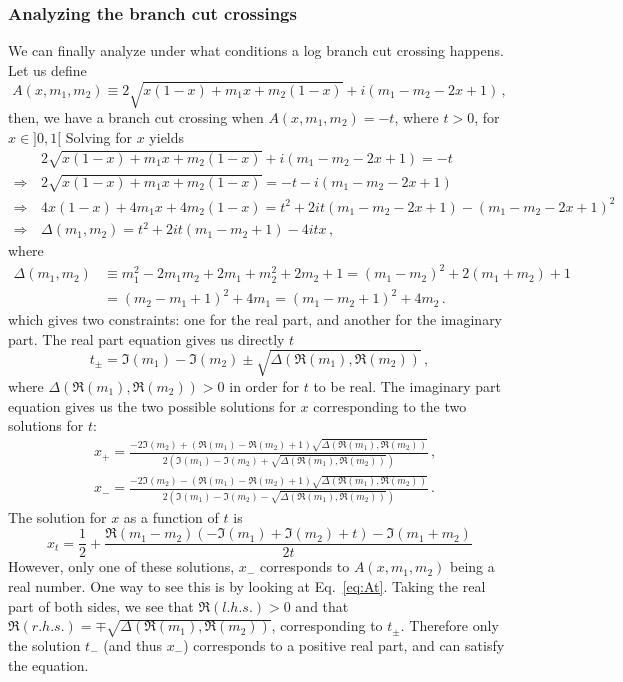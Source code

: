 \documentclass[twoside]{article}
\begin{document}
\subsubsection{Analyzing the branch cut crossings}

We can finally analyze under what conditions a log branch cut crossing happens. Let us define 
\begin{equation}
\label{eq:A}
A(x, m_1, m_2) \equiv 2 \sqrt{x (1-x) + m_1 x + m_2 (1-x)}+i (m_1-m_2-2 x+1)\,,
\end{equation}
then, we have a branch cut crossing when $A(x, m_1, m_2) = -t$, where $t>0$, for $x \in ]0,1[$
Solving for $x$ yields
\begin{align}
& 2\sqrt{x (1-x) + m_1 x + m_2 (1-x)}+i (m_1-m_2-2 x+1) = -t \\
\label{eq:At}\Rightarrow\, & 2\sqrt{x (1-x) + m_1 x + m_2 (1-x)} = -t - i (m_1 - m_2 - 2 x +1) \\
\Rightarrow\, & 4 x (1-x) + 4 m_1 x + 4 m_2 (1-x) = t^2 + 2 i t (m_1 - m_2 - 2 x +1) - (m_1 - m_2 - 2 x +1)^2 \\
\Rightarrow\, & \Delta(m_1, m_2) = t^2 + 2 i t (m_1 - m_2 + 1) - 4 i t x  \,,
\end{align}
where
\begin{equation}
\begin{split}
\Delta(m_1, m_2) &\equiv m_1^2-2 m_1 m_2+2 m_1+m_2^2+2 m_2+1 = (m_1-m_2)^2 + 2(m_1 + m_2) + 1\\
& = (m_2 - m_1 + 1)^2 + 4 m_1 = (m_1 - m_2 + 1)^2 + 4 m_2\,.
\end{split}
\end{equation}
which gives two constraints: one for the real part, and another for the imaginary part. The real part equation gives us directly $t$
\begin{equation}
t_\pm = \Im(m_1)-\Im(m_2)\pm\sqrt{\Delta(\Re(m_1), \Re(m_2))}\,,
\end{equation}
where $\Delta(\Re(m_1), \Re(m_2))>0$ in order for $t$ to be real.
The imaginary part equation gives us the two possible solutions for $x$ corresponding to the two solutions for $t$:
\begin{align}
& x_+ = \frac{- 2 \Im(m_2) + (\Re(m_1)-\Re(m_2)+1) \sqrt{\Delta(\Re(m_1), \Re(m_2))}}{2 \left(\Im(m_1)-\Im(m_2)+\sqrt{\Delta(\Re(m_1), \Re(m_2))}\right)} \,,\\
& x_- = \frac{- 2 \Im(m_2) - (\Re(m_1)-\Re(m_2)+1) \sqrt{\Delta(\Re(m_1), \Re(m_2))}}{2 \left(\Im(m_1)-\Im(m_2)-\sqrt{\Delta(\Re(m_1), \Re(m_2))}\right)}\,. \label{eq:xminus}
\end{align}
The solution for $x$ as a function of $t$ is
\begin{equation}
x_t = \frac{1}{2} + \frac{\Re(m_1-m_2) (-\Im(m_1)+\Im(m_2)+t)-\Im(m_1+m_2)}{2 t}
\end{equation}
However, only one of these solutions, $x_-$ corresponds to $A(x, m_1, m_2)$ being a real number. 
One way to see this is by looking at Eq.~\eqref{eq:At}. Taking the real part of both sides, we see that $\Re(l.h.s.) > 0$ and that $\Re(r.h.s.) = \mp \sqrt{\Delta(\Re(m_1), \Re(m_2))}$, corresponding to $t_\pm$. Therefore only the solution $t_-$ (and thus $x_-$) corresponds to a positive real part, and can satisfy the equation.
\end{document}
